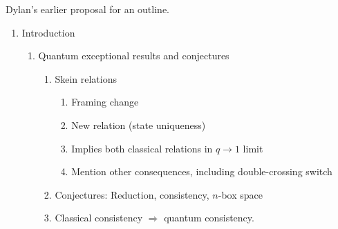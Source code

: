 \documentclass[12pt]{amsart}
\begin{document}
Dylan's earlier proposal for an outline.
\begin{enumerate}
\item Introduction
  \begin{enumerate}
  \item Quantum exceptional results and conjectures
    \begin{enumerate}
    \item Skein relations
      \begin{enumerate}
      \item Framing change
      \item New relation (state uniqueness)
      \item Implies both classical relations in $q \to 1$ limit
      \item Mention other consequences, including double-crossing switch
      \end{enumerate}
    \item Conjectures: Reduction, consistency, $n$-box space
    \item Classical consistency $\Rightarrow$ quantum consistency.


\end{enumerate}
\end{enumerate}
\end{enumerate}
\end{document}
